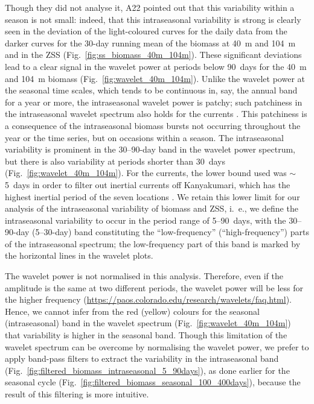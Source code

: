 \documentclass[authoryear,review,11pt]{elsarticle}
\begin{document}
Though they did not analyse it, A22 pointed out that this variability within a season is not small: indeed, that this intraseasonal variability is strong is clearly seen in the deviation of the light-coloured curves for the daily data from the darker curves for the 30-day running mean of the biomass at 40~m and 104~m and in the ZSS (Fig.~\ref{fig:ss_biomass_40m_104m}).  These significant deviations lead to a clear signal in the wavelet power at periods below 90~days for the 40~m and 104~m biomass (Fig.~\ref{fig:wavelet_40m_104m}).  Unlike the wavelet power at the seasonal time scales, which tends to be continuous in, say, the annual band for a year or more, the intraseasonal wavelet power is patchy; such patchiness in the intraseasonal wavelet spectrum also holds for the currents \citep{amol2014observed, mukherjee2014observed, chaudhuri2020observed, mukhopadhyay2020observed}. This patchiness is a consequence of the intraseasonal biomass bursts not occurring throughout the year or the time series, but on occasions within a season.  The intraseasonal variability is prominent in the 30--90-day band in the wavelet power spectrum, but there is also variability at periods shorter than 30~days (Fig.~\ref{fig:wavelet_40m_104m}). For the currents, the lower bound used was $\sim$5~days in order to filter out inertial currents off Kanyakumari, which has the highest inertial period of the seven locations \citep{amol2014observed, chaudhuri2020observed}.  We retain this lower limit for our analysis of the intraseasonal variability of biomass and ZSS, i.~e., we define the intraseasonal variability to occur in the period range of 5--90~days, with the 30--90-day (5--30-day) band constituting the ``low-frequency'' (``high-frequency'') parts of the intraseasonal spectrum; the low-frequency part of this band is marked by the horizontal lines in the wavelet plots.

The wavelet power is not normalised in this analysis.  Therefore, even if the amplitude is the same at two different periods, the wavelet power will be less for the higher frequency (\url{https://paos.colorado.edu/research/wavelets/faq.html}). Hence, we cannot infer from the red (yellow) colours for the seasonal (intraseasonal) band in the wavelet spectrum (Fig.~\ref{fig:wavelet_40m_104m}) that variability is higher in the seasonal band. Though this limitation of the wavelet spectrum can be overcome by normalising the wavelet power, we prefer to apply band-pass filters to extract the variability in the intraseasonal band (Fig.~\ref{fig:filtered_biomass_intraseasonal_5_90days}), as done earlier for the seasonal cycle (Fig.~\ref{fig:filtered_biomass_seasonal_100_400days}), because the result of this filtering is more intuitive. 
\end{document}
